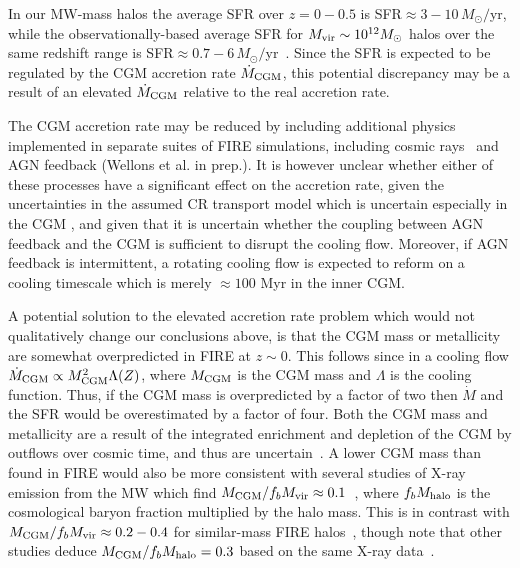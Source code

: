 \documentclass[fleqn,usenatbib]{mnras}
\newcommand{\Mdot}{\dot{M}}
\begin{document}
In our MW-mass halos the average SFR over $z=0-0.5$ is SFR$\approx 3-10\,M_\odot/$yr, while the observationally-based average SFR for $M_{\rm vir} \sim 10^{12} M_\odot$ halos over the same redshift range is SFR$\approx 0.7-6\,M_\odot/$yr~\citep{Behroozi2013}.
Since the SFR is expected to be regulated by the CGM accretion rate $\Mdot_{\rm CGM}$, this potential discrepancy may be a result of an elevated  $\Mdot_{\rm CGM}$ relative to the real accretion rate.

The CGM accretion rate may be reduced by including additional physics implemented in separate suites of FIRE simulations, including cosmic rays~\citep{Chan2019, Hopkins2020a, Hopkins2021e, Hopkins2021d} and AGN feedback (Wellons et al. in prep.).
It is however unclear whether either of these processes have a significant effect on the accretion rate, given the uncertainties in the assumed CR transport model which is uncertain especially in the CGM \citep{Hopkins2021, Quataert2021, Quataert2021a}, and given that it is uncertain whether the coupling between AGN feedback and the CGM is sufficient to disrupt the cooling flow.
Moreover, if AGN feedback is intermittent, a rotating cooling flow is expected to reform on a cooling timescale which is merely $\approx100$ Myr in the inner CGM. 

A potential solution to the elevated accretion rate problem which would not qualitatively change our conclusions above, is that the CGM mass or metallicity are somewhat overpredicted in FIRE at $z\sim0$.
This follows since in a cooling flow $\Mdot_{\rm CGM}\propto M_{\rm CGM}^2 \Lambda(Z)$, where $M_{\rm CGM}$ is the CGM mass and $\Lambda$ is the cooling function.
Thus, if the CGM mass is overpredicted by a factor of two then $\Mdot$ and the SFR would be overestimated by a factor of four.
Both the CGM mass and metallicity are a result of the integrated enrichment and depletion of the CGM by outflows over cosmic time, and thus are uncertain~\citep[e.g.,][]{Davies2021, Kelly2021}.
A lower CGM mass than found in FIRE would also be more consistent with several studies of X-ray emission from the MW which find $M_{\rm CGM}/f_bM_{\rm vir} \approx 0.1$~\citep[][]{Li2018, Bregman2018}, where $f_b M_{\rm halo}$ is the cosmological baryon fraction multiplied by the halo mass. %
This is in contrast with $M_{\rm CGM}/f_bM_{\rm vir} \approx 0.2-0.4$ for similar-mass FIRE halos~\citep{Hafen2019}, though note that other studies deduce $M_{\rm CGM}/f_bM_{\rm halo}=0.3$ based on the same X-ray data~\citep{Faerman2020}.
\end{document}

